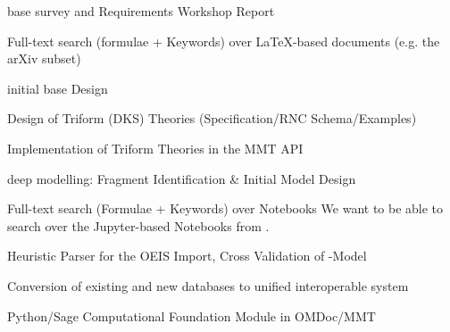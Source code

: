 \begin{workpackage}[id=dksbases,%
  title=Data/Knowledge/Software-Bases,lead=JU,
  ZHRM=12,JURM=46,UWRM=25,SARM=10,LLRM=2,PSRM=4]
\begin{wpdelivs}
  \begin{wpdeliv}[due=9,id=wsrep,dissem=PU,nature=R,lead=JU]{\DKS base survey and
      Requirements Workshop Report}
  \end{wpdeliv}
    \begin{wpdeliv}[id=mws,due=9,nature=OTHER,dissem=PU,lead=JU]
      {Full-text search (formulae + Keywords) over LaTeX-based documents
        (e.g. the arXiv subset)}
    \end{wpdeliv}
  \begin{wpdeliv}[due=12,id=design,dissem=PU,nature=R,lead=JU]
        {initial \DKS base Design}
   \end{wpdeliv}
  \begin{wpdeliv}[due=15,id=dkstheories,dissem=PU,nature=R,lead=JU]
        {Design of Triform (DKS) Theories (Specification/RNC Schema/Examples)}
  \end{wpdeliv}
  \begin{wpdeliv}[due=15,id=dksimp,dissem=PU,nature=OTHER,lead=JU]
        {Implementation of Triform Theories in the MMT API}
  \end{wpdeliv}
  \begin{wpdeliv}[due=18,id=lmfmod,dissem=PU,nature=R,lead=ZH]
      {\LMFDB deep modelling: Fragment Identification \& Initial Model Design}
  \end{wpdeliv}
    \begin{wpdeliv}[id=notebooksearch,due=18,nature=OTHER,dissem=PU,lead=JU]
      {Full-text search (Formulae + Keywords) over Notebooks}
      We want to be able to search over the Jupyter-based Notebooks from
      .
\end{wpdeliv}
  \begin{wpdeliv}[due=20,id=oeisparser,dissem=PU,nature=OTHER,lead=JU]
      {Heuristic Parser for the OEIS Import, Cross Validation of \DKS-Model}
  \end{wpdeliv}
  \begin{wpdeliv}[due=24,id=conv,dissem=PU,nature=DEC,lead=ZH]
        {Conversion of existing and new databases to unified interoperable system}
   \end{wpdeliv}
  \begin{wpdeliv}[due=24,id=psfoundation,dissem=PU,nature=OTHER,lead=JU]
        {Python/Sage Computational Foundation Module in OMDoc/MMT}
  \end{wpdeliv}
  \begin{wpdeliv}[due=30,id=findstat,dissem=PU,nature=OTHER,lead=JU]

\end{wpdeliv}
\end{wpdelivs}
\end{workpackage}
